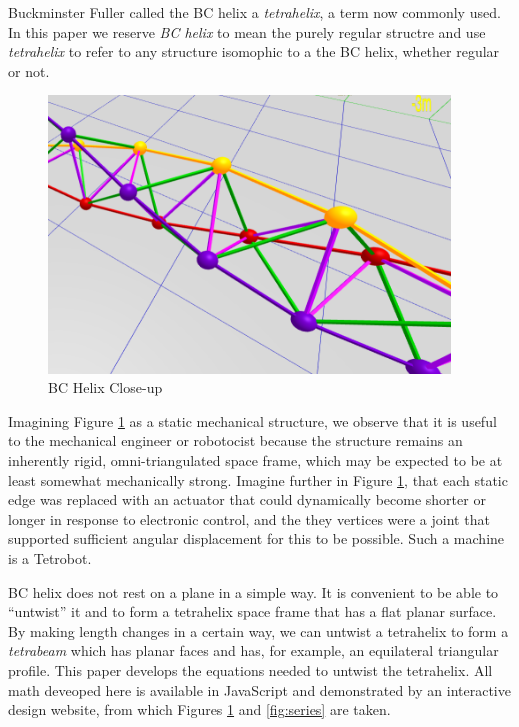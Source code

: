 \documentclass[11pt]{article}
\begin{document}
Buckminster Fuller called the BC helix a \emph{tetrahelix}\cite{fuller1982synergetics},
a term now commonly used. In this paper we reserve \emph{BC helix} to mean the purely regular structre and use \emph{tetrahelix} to refer
to any structure isomophic to a the BC helix, whether regular or not.

\begin{figure}[H] %
  \label{fig:closeup}
  \centering
     \includegraphics[width=0.95\textwidth]{figures/BCHelixCloseUp.png}
     \caption{BC Helix Close-up}
\end{figure}


Imagining Figure \ref{fig:closeup} as a static mechanical structure,
we observe that it is useful to the mechanical engineer or
robotocist because the structure remains an inherently rigid,
omni-triangulated space frame, which may be expected to be at least
somewhat mechanically strong.
Imagine further in Figure \ref{fig:closeup}, that each static edge was replaced with an
actuator that could dynamically become shorter or longer in response to electronic control,
and the they vertices were a joint that supported sufficient angular displacement
for this to be possible. Such a machine is a Tetrobot\cite{TetrobotBook}.

BC helix does not rest on a plane in a simple way. It is convenient to
be able to ``untwist'' it and to form a tetrahelix space frame that has a
flat planar surface. By making length changes in a certain way, we can
untwist a tetrahelix to form a \emph{tetrabeam} which has planar faces
and has, for example, an equilateral triangular profile. This paper
develops the equations needed to untwist the tetrahelix. All math
deveoped here is available in JavaScript and demonstrated by an interactive
design website\cite{readtetrahelix}, from which Figures \ref{fig:closeup} and
\ref{fig:series} are taken.
\end{document}
